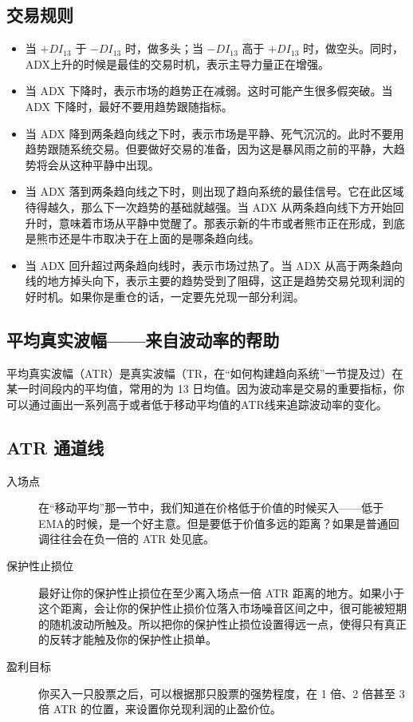 \subsection*{交易规则}
\begin{itemize}
    \item 当 $+DI_{13}$ 于 $-DI_{13}$ 时，做多头；当 $-DI_{13}$ 高于 $+DI_{13}$ 时，做空头。同时，ADX上升的时候是最佳的交易时机，表示主导力量正在增强。
    \item 当 ADX 下降时，表示市场的趋势正在减弱。这时可能产生很多假突破。当 ADX 下降时，最好不要用趋势跟随指标。
    \item 当 ADX 降到两条趋向线之下时，表示市场是平静、死气沉沉的。此时不要用趋势跟随系统交易。但要做好交易的准备，因为这是暴风雨之前的平静，大趋势将会从这种平静中出现。
    \item 当 ADX 落到两条趋向线之下时，则出现了趋向系统的最佳信号。它在此区域待得越久，那么下一次趋势的基础就越强。当 ADX 从两条趋向线下方开始回升时，意味着市场从平静中觉醒了。那表示新的牛市或者熊市正在形成，到底是熊市还是牛市取决于在上面的是哪条趋向线。
    \item 当 ADX 回升超过两条趋向线时，表示市场过热了。当 ADX 从高于两条趋向线的地方掉头向下，表示主要的趋势受到了阻碍，这正是趋势交易兑现利润的好时机。如果你是重仓的话，一定要先兑现一部分利润。
\end{itemize}
\subsection*{平均真实波幅——来自波动率的帮助}
平均真实波幅（ATR）是真实波幅（TR，在“如何构建趋向系统”一节提及过）在某一时间段内的平均值，常用的为 13 日均值。因为波动率是交易的重要指标，你可以通过画出一系列高于或者低于移动平均值的ATR线来追踪波动率的变化。
\subsection*{ATR 通道线}
\begin{description}
    \item[入场点]在“移动平均”那一节中，我们知道在价格低于价值的时候买入——低于EMA的时候，是一个好主意。但是要低于价值多远的距离？如果是普通回调往往会在负一倍的 ATR 处见底。
    \item[保护性止损位]最好让你的保护性止损位在至少离入场点一倍 ATR 距离的地方。如果小于这个距离，会让你的保护性止损价位落入市场噪音区间之中，很可能被短期的随机波动所触及。所以把你的保护性止损位设置得远一点，使得只有真正的反转才能触及你的保护性止损单。
    \item[盈利目标]你买入一只股票之后，可以根据那只股票的强势程度，在 1 倍、2 倍甚至 3 倍 ATR 的位置，来设置你兑现利润的止盈价位。
\end{description}

